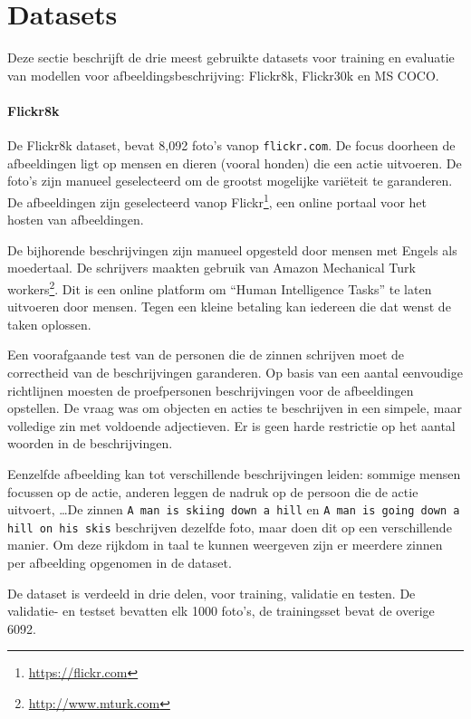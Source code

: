 \section{Datasets}
\label{sec:Datasets}
Deze sectie beschrijft de drie meest gebruikte datasets voor training en evaluatie van modellen voor afbeeldingsbeschrijving: Flickr8k, Flickr30k en MS COCO.

\paragraph{Flickr8k}
\label{par:Flickr8k}
De Flickr8k dataset\cite{Hodosh2013}, bevat 8,092 foto's vanop \texttt{flickr.com}. De focus doorheen de afbeeldingen ligt op mensen en dieren (vooral honden) die een actie uitvoeren. De foto's zijn manueel geselecteerd om de grootst mogelijke vari\"eteit te garanderen. De afbeeldingen zijn geselecteerd vanop Flickr\footnote{\url{https://flickr.com}}, een online portaal voor het hosten van afbeeldingen.

De bijhorende beschrijvingen zijn manueel opgesteld door mensen met Engels als moedertaal. De schrijvers maakten gebruik van Amazon Mechanical Turk workers\footnote{\url{http://www.mturk.com}}. Dit is een online platform om ``Human Intelligence Tasks'' te laten uitvoeren door mensen. Tegen een kleine betaling kan iedereen die dat wenst de taken oplossen. 

Een voorafgaande test van de personen die de zinnen schrijven moet de correctheid van de beschrijvingen garanderen. Op basis van een aantal eenvoudige richtlijnen moesten de proefpersonen beschrijvingen voor de afbeeldingen opstellen. De vraag was om objecten en acties te beschrijven in een simpele, maar volledige zin met voldoende adjectieven. Er is geen harde restrictie op het aantal woorden in de beschrijvingen\cite{Hockenmaier2014}.

Eenzelfde afbeelding kan tot verschillende beschrijvingen leiden: sommige mensen focussen op de actie, anderen leggen de nadruk op de persoon die de actie uitvoert, \ldots De zinnen \texttt{A man is skiing down a hill} en \texttt{A man is going down a hill on his skis} beschrijven dezelfde foto, maar doen dit op een verschillende manier. Om deze rijkdom in taal te kunnen weergeven zijn er meerdere zinnen per afbeelding opgenomen in de dataset.

De dataset is verdeeld in drie delen, voor training, validatie en testen. De validatie- en testset bevatten elk 1000 foto's, de trainingsset bevat de overige 6092.


